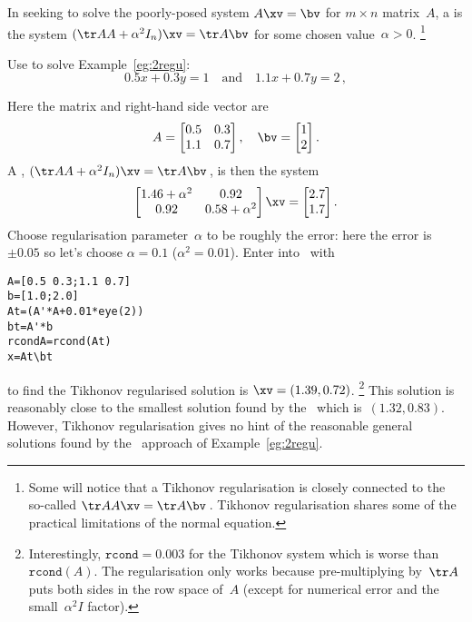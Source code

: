 \begin{definition} \label{def:Tikreg}
In seeking to solve the poorly-posed system \(A\xv=\bv\) for \(m\times n\) matrix~\(A\), a  is the system \((\tr AA+\alpha^2I_n)\xv=\tr A\bv\) for some chosen  value~\(\alpha>0\).
\footnote{Some will notice that a Tikhonov regularisation is closely connected to the so-called  \(\tr AA\xv=\tr A\bv\)\,.  
Tikhonov regularisation shares some of the practical limitations of the normal equation.}
\end{definition}


\begin{example} \label{eg:}
Use  to solve Example~\ref{eg:2regu}:
\begin{equation*}
0.5x+0.3y=1\quad\text{and}\quad 1.1x+0.7y=2\,,
\end{equation*}
\begin{solution} 
Here the matrix and right-hand side vector are
\begin{equation*}
A=\begin{bmatrix} 0.5&0.3\\1.1&0.7 \end{bmatrix},\quad
\bv=\begin{bmatrix} 1\\2 \end{bmatrix}.
\end{equation*}
A , \((\tr AA+\alpha^2I_n)\xv=\tr A\bv\)\,, is then the system
\begin{equation*}
\begin{bmatrix} 1.46+\alpha^2&0.92\\0.92&0.58+\alpha^2 \end{bmatrix}\xv=\begin{bmatrix} 2.7\\1.7 \end{bmatrix}.
\end{equation*}
Choose regularisation parameter~\(\alpha\) to be roughly the error: here the error is~\(\pm0.05\) so let's choose \(\alpha=0.1\) (\(\alpha^2=0.01\)).
Enter into \script\ with
\begin{verbatim}
A=[0.5 0.3;1.1 0.7]
b=[1.0;2.0]
At=(A'*A+0.01*eye(2))
bt=A'*b
rcondA=rcond(At)
x=At\bt
\end{verbatim}
\setbox\ajrqrbox\hbox{}%
\marginpar{\usebox{\ajrqrbox\\[2ex]}}%
to find the Tikhonov regularised solution is \(\xv=(1.39,0.72)\).%
\footnote{Interestingly, \(\texttt{rcond}=0.003\) for the Tikhonov system which is worse than \(\texttt{rcond}(A)\).  The regularisation only works because pre-multiplying by~\(\tr A\) puts both sides in the row space of~\(A\) (except for numerical error and the small~\(\alpha^2I\) factor).}
This solution is reasonably close to the smallest solution found by the \svd\ which is~\((1.32,0.83)\).
However, Tikhonov regularisation gives no hint of the reasonable general solutions found by the \svd\ approach of Example~\ref{eg:2regu}.


\end{solution}
\end{example}
